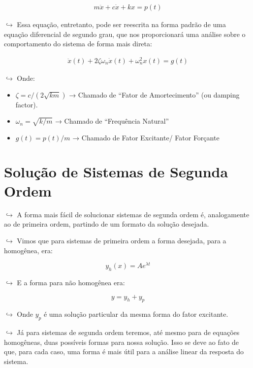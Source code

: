 \documentclass[]{article}
\providecommand{\tightlist}{%
  \setlength{\itemsep}{0pt}\setlength{\parskip}{0pt}}
\begin{document}
  \[
  \begin{align}
  m\ddot x + c\dot x + kx = p(t)
  \end{align}
  \]

  \(\hookrightarrow\) Essa equação, entretanto, pode ser reescrita na
  forma padrão de uma equação diferencial de segundo grau, que nos
  proporcionará uma análise sobre o comportamento do sistema de forma mais
  direta:

  \[
  \begin{align}
  \ddot x(t) + 2\zeta \omega _n\dot x(t) + \omega^2_nx(t) = g(t)
  \end{align}
  \]

  \(\hookrightarrow\) Onde:

  \begin{itemize}
  \tightlist
  \item
    \(\zeta = c/(2\sqrt{ km})\) → Chamado de ``Fator de Amortecimento''
    (ou damping factor).
  \item
    \(\omega_n = \sqrt{k/m}\) → Chamado de ``Frequência Natural''
  \item
    \(g(t) = p(t) /m\) → Chamado de Fator Excitante/ Fator Forçante
  \end{itemize}

  \hypertarget{soluuxe7uxe3o-de-sistemas-de-segunda-ordem}{%
  \section{Solução de Sistemas de Segunda
  Ordem}\label{soluuxe7uxe3o-de-sistemas-de-segunda-ordem}}

  \(\hookrightarrow\) A forma mais fácil de solucionar sistemas de segunda
  ordem é, analogamente ao de primeira ordem, partindo de um formato da
  solução desejada.

  \(\hookrightarrow\) Vimos que para sistemas de primeira ordem a forma
  desejada, para a homogênea, era:

  \[
  y_h(x) = Ae^{\lambda t}
  \]

  \(\hookrightarrow\) E a forma para não homogênea era:

  \[
  y = y_h + y_p
  \]

  \(\hookrightarrow\) Onde \(y_p\) é uma solução particular da mesma forma
  do fator excitante.

  \(\hookrightarrow\) Já para sistemas de segunda ordem teremos, até mesmo
  para de equações homogêneas, duas possíveis formas para nossa solução.
  Isso se deve ao fato de que, para cada caso, uma forma é mais útil para
  a análise linear da resposta do sistema.
\end{document}
